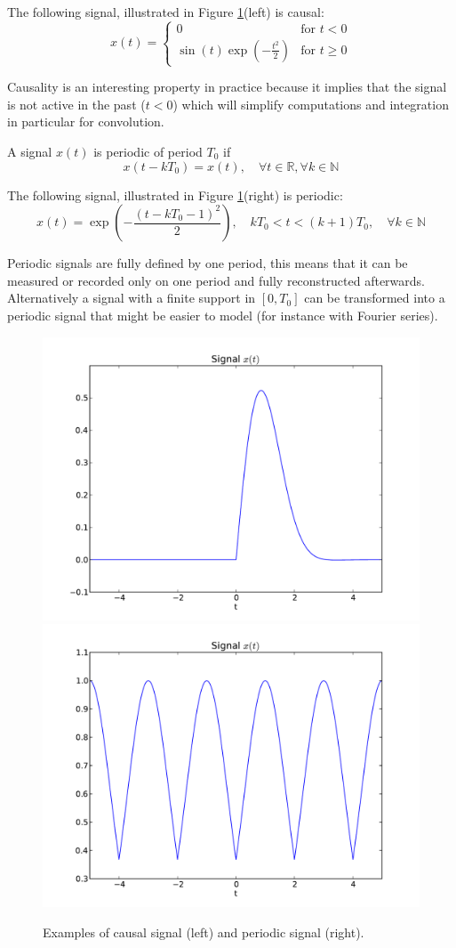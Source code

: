 \begin{example} The following signal, illustrated in Figure \ref{fig:ex_causal_per}(left)  is causal:
  $$x(t)= \begin{cases}
    0& \text{for } t<0\\
    \sin(t)\exp\left(-\frac{t^2}{2}\right) & \text{for } t\geq 0
    \end{cases}$$
\end{example}

Causality is an interesting property in practice because it implies that the
signal is not active in the past ($t<0$) which will simplify computations and
integration in particular for convolution.

\begin{definition}[Periodicity] 
  A signal $x(t)$ is periodic of period $T_0$ if
$$x(t-kT_0)=x(t), \quad \forall t\in\mathbb{R}, \forall k\in\mathbb{N}$$      
\end{definition}


\begin{example}
  The following signal, illustrated in Figure \ref{fig:ex_causal_per}(right)  is
  periodic:
  $$x(t)= %
     \exp\left(-\frac{(t-kT_0-1)^2}{2}\right),\quad kT_0<t<(k+1)T_0,\quad
     \forall k\in\mathbb{N}$$
\end{example}

Periodic signals are fully defined by one period, this means that it can be
measured or recorded only on one period and fully reconstructed afterwards. Alternatively a
signal with a finite support in $[0,T_0]$ can be transformed into a periodic
signal that might be easier to model (for instance with Fourier series).
  
\begin{figure}[t]
    \centering
    \includegraphics[width=.45\linewidth]{imgs/sig_conv/sig_causal.pdf}
    \includegraphics[width=.45\linewidth]{imgs/sig_conv/sig_per.pdf}
    \caption{Examples of causal signal (left) and periodic signal (right).}
    \label{fig:ex_causal_per}
\end{figure}

